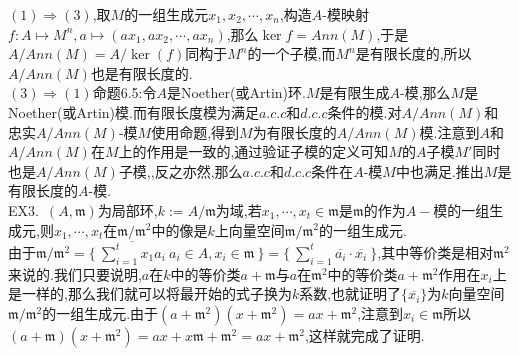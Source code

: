 \documentclass[b5paper]{ctexart}
\begin{document}
$(1)\Rightarrow (3)$,取$M$的一组生成元$x_1,x_2,\cdots,x_n$,构造$A$-模映射$f:A\mapsto M^n,a\mapsto (ax_1,ax_2,\cdots,ax_n)$,那么$\ker f=Ann(M)$,于是$A/Ann(M)=A/\ker(f)$同构于$M^n$的一个子模,而$M^n$是有限长度的,所以$A/Ann(M)$也是有限长度的.\\
$(3)\Rightarrow (1)$命题6.5:令$A$是Noether(或Artin)环.$M$是有限生成$A$-模,那么$M$是Noether(或Artin)模.而有限长度模为满足$a.c.c$和$d.c.c$条件的模.对$A/Ann(M)$和忠实$A/Ann(M)$-模$M$使用命题,得到$M$为有限长度的$A/Ann(M)$模.注意到$A$和$A/Ann(M)$在$M$上的作用是一致的,通过验证子模的定义可知$M$的$A$子模$M'$同时也是$A/Ann(M)$子模,,反之亦然,那么$a.c.c$和$d.c.c$条件在$A$-模$M$中也满足.推出$M$是有限长度的$A$-模.\\
EX3.~$(A,\mathfrak{m})$为局部环,$k:=A/\mathfrak{m}$为域,若$x_1,\cdots,x_t\in\mathfrak{m}$是$\mathfrak{m}$的作为$A-$模的一组生成元,则$x_1,\cdots,x_t$在$\mathfrak{m}/\mathfrak{m}^2$中的像是$k$上向量空间$\mathfrak{m}/\mathfrak{m}^2$的一组生成元.\\
由于$\mathfrak{m}/\mathfrak{m}^2=\{~\overline{\sum_{i=1}^tx_1a_i}~a_i\in A,x_i\in\mathfrak{m}~\}=\{~\sum_{i=1}^{t}\overline{a_i}\cdot\overline{x_i}~\}$,其中等价类是相对$\mathfrak{m}^2$来说的.我们只要说明,$a$在$k$中的等价类$a+\mathfrak{m}$与$a$在$\mathfrak{m}^2$中的等价类$a+\mathfrak{m}^2$作用在$x_i$上是一样的,那么我们就可以将最开始的式子换为$k$系数,也就证明了$\{\overline{x_i}\}$为$k$向量空间$\mathfrak{m}/\mathfrak{m}^2$的一组生成元.由于$(a+\mathfrak{m}^2)(x+\mathfrak{m}^2)=ax+\mathfrak{m}^2$,注意到$x_i\in\mathfrak{m}$所以$(a+\mathfrak{m})(x+\mathfrak{m}^2)=ax+x\mathfrak{m}+\mathfrak{m}^2=ax+\mathfrak{m}^2$,这样就完成了证明.
\end{document}
